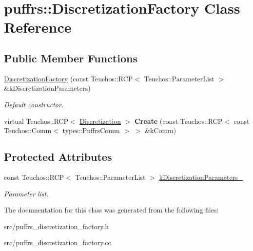 \hypertarget{classpuffrs_1_1DiscretizationFactory}{}\section{puffrs\+:\+:Discretization\+Factory Class Reference}
\label{classpuffrs_1_1DiscretizationFactory}
\subsection*{Public Member Functions}
\begin{DoxyCompactItemize}
\item 
\mbox{\label{classpuffrs_1_1DiscretizationFactory_af6d6e4dfb783d8a85208680f84e50cda}} 
\hyperlink{classpuffrs_1_1DiscretizationFactory_af6d6e4dfb783d8a85208680f84e50cda}{Discretization\+Factory} (const Teuchos\+::\+R\+CP$<$ Teuchos\+::\+Parameter\+List $>$ \&k\+Discretization\+Parameters)
\begin{DoxyCompactList}\small\item\em Default constructor. \end{DoxyCompactList}\item 
\mbox{\label{classpuffrs_1_1DiscretizationFactory_a179e7c336204e55c07de5510398b090a}} 
virtual Teuchos\+::\+R\+CP$<$ \hyperlink{classpuffrs_1_1Discretization}{Discretization} $>$ {\bfseries Create} (const Teuchos\+::\+R\+CP$<$ const Teuchos\+::\+Comm$<$ types\+::\+Puffrs\+Comm $>$ $>$ \&k\+Comm)
\end{DoxyCompactItemize}
\subsection*{Protected Attributes}
\begin{DoxyCompactItemize}
\item 
\mbox{\label{classpuffrs_1_1DiscretizationFactory_a5375e76d7af9c10d52eb374ead8a922c}} 
const Teuchos\+::\+R\+CP$<$ Teuchos\+::\+Parameter\+List $>$ \hyperlink{classpuffrs_1_1DiscretizationFactory_a5375e76d7af9c10d52eb374ead8a922c}{k\+Discretization\+Parameters\+\_\+}
\begin{DoxyCompactList}\small\item\em Parameter list. \end{DoxyCompactList}\end{DoxyCompactItemize}


The documentation for this class was generated from the following files\+:\begin{DoxyCompactItemize}
\item 
src/puffrs\+\_\+discretization\+\_\+factory.\+h\item 
src/puffrs\+\_\+discretization\+\_\+factory.\+cc\end{DoxyCompactItemize}
